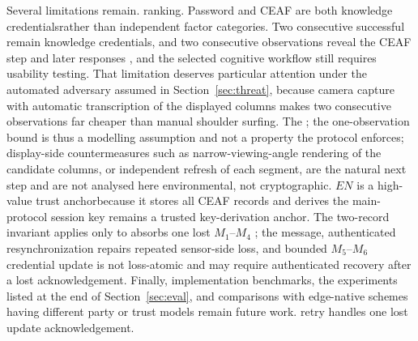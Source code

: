 \documentclass[cmc,article,submit,moreauthors,pdftex]{Definitions/tsp}
\providecommand{\DIFadd}[1]{{\protect\color{blue} \sf #1}} %
\providecommand{\DIFdel}[1]{{\protect\color{red} \scriptsize #1}} %
\providecommand{\DIFaddbegin}{} %
\providecommand{\DIFaddend}{} %
\providecommand{\DIFdelbegin}{} %
\providecommand{\DIFdelend}{} %
\begin{document}
\DIFdel{Several limitations remain. }\DIFdelend \DIFaddbegin \DIFadd{ranking. }\DIFaddend Password and CEAF \DIFdelbegin \DIFdel{are both knowledge credentialsrather than independent factor categories. Two consecutive successful }\DIFdelend \DIFaddbegin \DIFadd{remain knowledge credentials, and two consecutive }\DIFaddend observations reveal the CEAF step \DIFdelbegin \DIFdel{and later responses \cite{blum}, and the selected cognitive workflow still requires usability testing. That limitation deserves particular attention under the automated adversary assumed in Section~\ref{sec:threat}, because camera capture with automatic transcription of the displayed columns makes two consecutive observations far cheaper than manual shoulder surfing. The }\DIFdelend \DIFaddbegin \DIFadd{\cite{blum}; the }\DIFaddend one-observation bound is \DIFdelbegin \DIFdel{thus a modelling assumption and not a property the protocol enforces; display-side countermeasures such as narrow-viewing-angle rendering of the candidate columns, or independent refresh of each segment, are the natural next step and are not analysed here}\DIFdelend \DIFaddbegin \DIFadd{environmental, not cryptographic}\DIFaddend . $EN$ \DIFdelbegin \DIFdel{is a high-value trust anchorbecause it stores all CEAF records and derives the main-protocol session key}\DIFdelend \DIFaddbegin \DIFadd{remains a trusted key-derivation anchor}\DIFaddend . The two-record invariant \DIFdelbegin \DIFdel{applies only to }\DIFdelend \DIFaddbegin \DIFadd{absorbs one lost }\DIFaddend $M_1$--$M_4$ \DIFdelbegin \DIFdel{; the }\DIFdelend \DIFaddbegin \DIFadd{message, authenticated resynchronization repairs repeated sensor-side loss, and bounded }\DIFaddend $M_5$--$M_6$ \DIFdelbegin \DIFdel{credential update is not loss-atomic and may require authenticated recovery after a lost acknowledgement. Finally, implementation benchmarks, the experiments listed at the end of Section~\ref{sec:eval}, and comparisons with edge-native schemes having different party or trust models \cite{cui,shang} remain future work.
}\DIFdelend \DIFaddbegin \DIFadd{retry handles one lost update acknowledgement.
}\DIFaddend 
\end{document}
